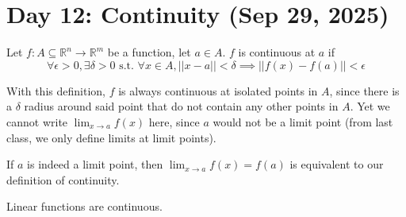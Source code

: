 \section{Day 12: Continuity (Sep 29, 2025)}

\begin{definition}[Continuity]
Let $f: A \subseteq \mathbb{R}^n \to \mathbb{R}^m$ be a function, let $a \in A$. $f$ is continuous at $a$ if
\[
    \forall \epsilon > 0, \exists \delta > 0 \text{ s.t. } \forall x \in A, ||x - a|| < \delta \implies ||f(x) - f(a)|| < \epsilon 
\]
\end{definition}

With this definition, $f$ is always continuous at isolated points in $A$, since there is a $\delta$ radius around said point that do not contain any other points in $A$. Yet we cannot write $\displaystyle \lim_{ x \to a } f(x)$ here, since $a$ would not be a limit point (from last class, we only define limits at limit points). 

\begin{simplethm}
If $a$ is indeed a limit point, then $\displaystyle \lim_{ x \to a } f(x) = f(a)$ is equivalent to our definition of continuity. 
\end{simplethm}


\begin{simplethm}
Linear functions are continuous.
\end{simplethm}
